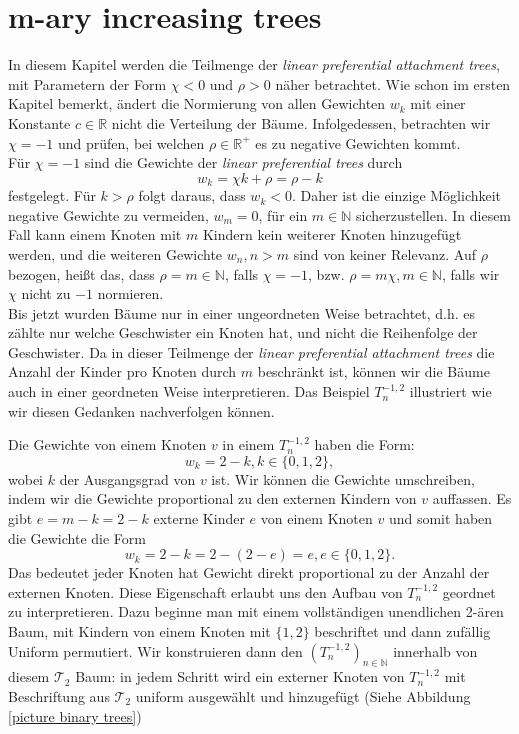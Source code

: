 
\chapter{m-ary increasing trees}
In diesem Kapitel werden die Teilmenge der \textit{linear preferential attachment trees}, mit Parametern der Form $\chi < 0$ und $\rho > 0$ näher betrachtet. Wie schon im ersten Kapitel bemerkt, ändert die Normierung von allen Gewichten $w_k$ mit einer Konstante $c \in \mathbb{R}$ nicht die Verteilung der Bäume. Infolgedessen, betrachten wir $\chi = -1$ und prüfen, bei welchen $\rho \in \mathbb{R}^{+}$ es zu negative Gewichten kommt.\\
Für $\chi = -1$ sind die Gewichte der \textit{linear preferential trees} durch 
\[
    w_k = \chi k + \rho =  \rho - k 
\]
festgelegt. Für $k > \rho$ folgt daraus, dass $w_k < 0$. Daher ist die einzige Möglichkeit negative Gewichte zu vermeiden, $w_m = 0$, für ein $m \in \mathbb{N}$ sicherzustellen. In diesem Fall kann einem Knoten mit $m$ Kindern kein weiterer Knoten hinzugefügt werden, und die weiteren Gewichte $w_n, n > m$ sind von keiner Relevanz. Auf $\rho$ bezogen, heißt das, dass $\rho = m\in \mathbb{N}$, falls $\chi = -1$, bzw. $\rho= m\chi, m \in \mathbb{N}$, falls wir $\chi$ nicht zu $-1$ normieren.\\
Bis jetzt wurden Bäume nur in einer ungeordneten Weise betrachtet, d.h. es zählte nur welche Geschwister ein Knoten hat, und nicht die Reihenfolge der Geschwister. Da in dieser Teilmenge der \textit{linear preferential attachment trees} die Anzahl der Kinder pro Knoten durch $m$ beschränkt ist, können wir die Bäume auch in einer geordneten Weise interpretieren. Das Beispiel $T_n^{-1,2}$ illustriert wie wir diesen Gedanken nachverfolgen können.
\begin{Beispiel}
    Die Gewichte von einem Knoten $v$ in einem $T_n^{-1,2}$ haben die Form: 
    \[
        w_k = 2 - k, k \in \{0,1,2\},
    \]
    wobei $k$ der Ausgangsgrad von $v$ ist. Wir können die Gewichte umschreiben, indem wir die Gewichte proportional zu den externen Kindern von $v$ auffassen. Es gibt $e = m - k = 2-k$ externe Kinder $e$ von einem Knoten $v$ und somit haben die Gewichte die Form 
    \[
        w_k = 2 -k = 2 - (2-e) = e, e \in \{0,1,2\}. 
    \]
    Das bedeutet jeder Knoten hat Gewicht direkt proportional zu der Anzahl der externen Knoten. Diese Eigenschaft erlaubt uns den Aufbau von $T_n^{-1,2}$ geordnet zu interpretieren. Dazu beginne man mit einem vollständigen unendlichen 2-ären Baum, mit Kindern von einem Knoten mit $\{1,2\}$ beschriftet und dann zufällig Uniform permutiert. Wir konstruieren dann den $(T_n^{-1,2})_{n \in \mathbb{N}}$ innerhalb von diesem $\mathcal{T}_2$ Baum: in jedem Schritt wird ein externer Knoten von $T_n^{-1,2}$ mit Beschriftung aus $\mathcal{T}_2$ uniform ausgewählt und hinzugefügt (Siehe Abbildung \ref{picture binary trees})
\end{Beispiel}

